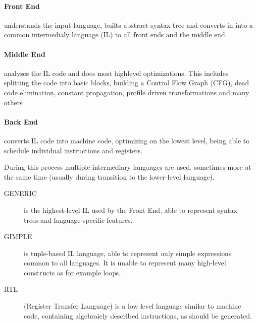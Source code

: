 \paragraph{Front End} understands the input language, builts abstract syntax
tree and converts in into a common intermedialy language (IL) to all front ends
and the middle end.

\paragraph{Middle End} analyses the IL code and does most highlevel
optimizations. This includes splitting the code into basic blocks, building a
Control Flow Graph (CFG), dead code elimination, constant propagation, profile
driven transformations and many others 

\paragraph{Back End} converts IL code into machine code, optimizing on the
lowest level, being able to schedule individual instructions and registers.

During this process multiple intermediary languages are used, sometimes more at
the same time (usually during transition to the lower-level language).

\begin{description}
	\item[GENERIC] is the highest-level IL used by the Front End, able to
		represent syntax trees and language-specific features.
	\item[GIMPLE] is tuple-based IL language, able to represent only simple
		expressions common to all languages. It is unable to represent many
		high-level constructs as for example loops.
	\item[RTL] (Register Transfer Language) is a low level language similar to
		machine code, containing algebraicly described instructions, as should
		be generated.
\end{description}
